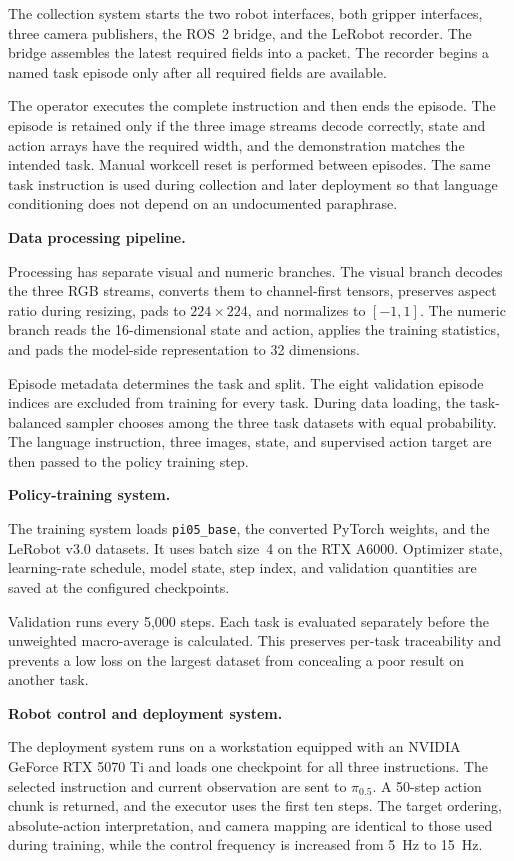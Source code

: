 The collection system starts the two robot interfaces, both gripper interfaces, three camera publishers, the ROS~2 bridge, and the LeRobot recorder. The bridge assembles the latest required fields into a packet. The recorder begins a named task episode only after all required fields are available.

The operator executes the complete instruction and then ends the episode. The episode is retained only if the three image streams decode correctly, state and action arrays have the required width, and the demonstration matches the intended task. Manual workcell reset is performed between episodes. The same task instruction is used during collection and later deployment so that language conditioning does not depend on an undocumented paraphrase.

\medskip
\noindent\textbf{Data processing pipeline.}

Processing has separate visual and numeric branches. The visual branch decodes the three RGB streams, converts them to channel-first tensors, preserves aspect ratio during resizing, pads to \(224\times224\), and normalizes to \([-1,1]\). The numeric branch reads the 16-dimensional state and action, applies the training statistics, and pads the model-side representation to 32 dimensions.

Episode metadata determines the task and split. The eight validation episode indices are excluded from training for every task. During data loading, the task-balanced sampler chooses among the three task datasets with equal probability. The language instruction, three images, state, and supervised action target are then passed to the policy training step.

\medskip
\noindent\textbf{Policy-training system.}

The training system loads \texttt{pi05\_base}, the converted PyTorch weights, and the LeRobot v3.0 datasets. It uses batch size~4 on the RTX A6000. Optimizer state, learning-rate schedule, model state, step index, and validation quantities are saved at the configured checkpoints.

Validation runs every 5,000 steps. Each task is evaluated separately before the unweighted macro-average is calculated. This preserves per-task traceability and prevents a low loss on the largest dataset from concealing a poor result on another task.

\medskip
\noindent\textbf{Robot control and deployment system.}

The deployment system runs on a workstation equipped with an NVIDIA GeForce RTX 5070 Ti and loads one checkpoint for all three instructions. The selected instruction and current observation are sent to $\pi_{0.5}$. A 50-step action chunk is returned, and the executor uses the first ten steps. The target ordering, absolute-action interpretation, and camera mapping are identical to those used during training, while the control frequency is increased from 5~Hz to 15~Hz.


